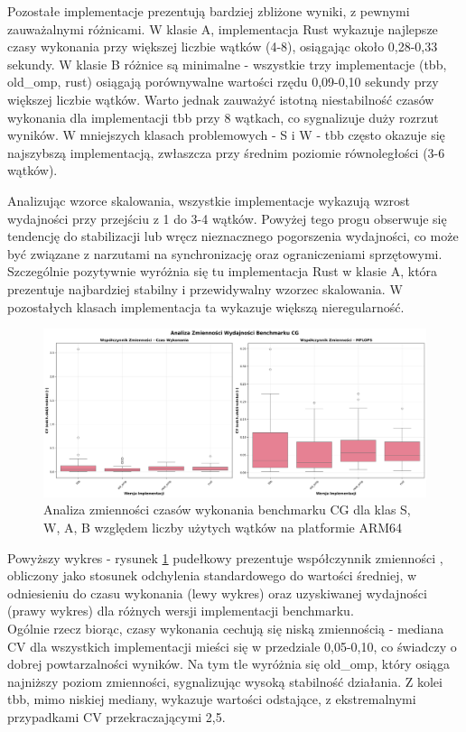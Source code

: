 Pozostałe implementacje prezentują bardziej zbliżone wyniki, z pewnymi zauważalnymi różnicami. W klasie A, implementacja Rust wykazuje najlepsze czasy wykonania przy większej liczbie wątków (4-8), osiągając około 0,28-0,33 sekundy. W klasie B różnice są minimalne - wszystkie trzy implementacje (tbb, old\_omp, rust) osiągają porównywalne wartości rzędu 0,09-0,10 sekundy przy większej liczbie wątków. Warto jednak zauważyć istotną niestabilność czasów wykonania dla implementacji tbb przy 8 wątkach, co sygnalizuje duży rozrzut wyników. W mniejszych klasach problemowych - S i W - tbb często okazuje się najszybszą implementacją, zwłaszcza przy średnim poziomie równoległości (3-6 wątków).

Analizując wzorce skalowania, wszystkie implementacje wykazują wzrost wydajności przy przejściu z 1 do 3-4 wątków. Powyżej tego progu obserwuje się tendencję do stabilizacji lub wręcz nieznacznego pogorszenia wydajności, co może być związane z narzutami na synchronizację oraz ograniczeniami sprzętowymi. Szczególnie pozytywnie wyróżnia się tu implementacja Rust w klasie A, która prezentuje najbardziej stabilny i przewidywalny wzorzec skalowania. W pozostałych klasach implementacja ta wykazuje większą nieregularność.

\begin{figure}[H]
    \centering
    \includegraphics[width=\textwidth]{analiza/images/parallel/cg/arm/cg_analiza_zmiennosci.png}
    \caption{Analiza zmienności czasów wykonania benchmarku CG dla klas S, W, A, B względem liczby użytych wątków na platformie ARM64}
    \label{cg_analiza_zmiennosci}
\end{figure}
Powyższy wykres - rysunek \ref{cg_analiza_zmiennosci} pudełkowy prezentuje współczynnik zmienności , obliczony jako stosunek odchylenia standardowego do wartości średniej, w odniesieniu do czasu wykonania (lewy wykres) oraz uzyskiwanej wydajności (prawy wykres) dla różnych wersji implementacji benchmarku.\\
Ogólnie rzecz biorąc, czasy wykonania cechują się niską zmiennością - mediana CV dla wszystkich implementacji mieści się w przedziale 0,05-0,10, co świadczy o dobrej powtarzalności wyników. Na tym tle wyróżnia się old\_omp, który osiąga najniższy poziom zmienności, sygnalizując wysoką stabilność działania. Z kolei tbb, mimo niskiej mediany, wykazuje wartości odstające, z ekstremalnymi przypadkami CV przekraczającymi 2,5.

